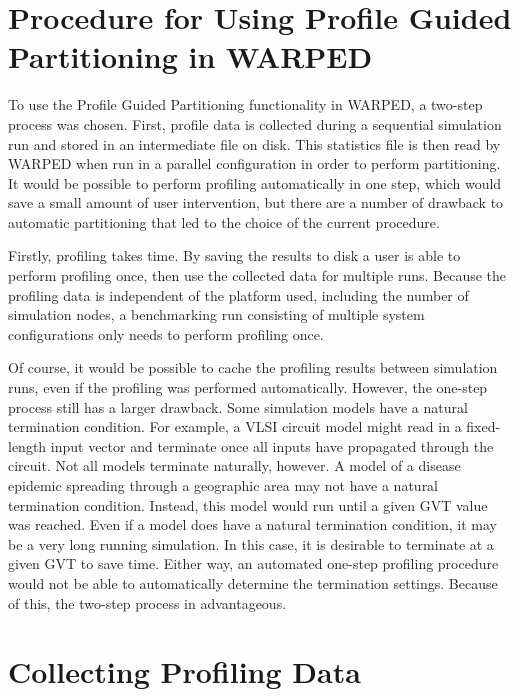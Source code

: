 \documentclass[11pt]{book}
\begin{document}
\section{Procedure for Using Profile Guided Partitioning in WARPED}

To use the Profile Guided Partitioning functionality in WARPED, a two-step process was chosen. First, profile data is collected during a sequential simulation run and stored in an intermediate file on disk. This statistics file is then read by WARPED when run in a parallel configuration in order to perform partitioning. It would be possible to perform profiling automatically in one step, which would save a small amount of user intervention, but there are a number of drawback to automatic partitioning that led to the choice of the current procedure.

Firstly, profiling takes time. By saving the results to disk a user is able to perform profiling once, then use the collected data for multiple runs. Because the profiling data is independent of the platform used, including the number of simulation nodes, a benchmarking run consisting of multiple system configurations only needs to perform profiling once. 

Of course, it would be possible to cache the profiling results between simulation runs, even if the profiling was performed automatically. However, the one-step process still has a larger drawback. Some simulation models have a natural termination condition. For example, a VLSI circuit model might read in a fixed-length input vector and terminate once all inputs have propagated through the circuit. Not all models terminate naturally, however. A model of a disease epidemic spreading through a geographic area may not have a natural termination condition. Instead, this model would run until a given GVT value was reached. Even if a model does have a natural termination condition, it may be a very long running simulation. In this case, it is desirable to terminate at a given GVT to save time. Either way, an automated one-step profiling procedure would not be able to automatically determine the termination settings. Because of this, the two-step process in advantageous.

\section{Collecting Profiling Data}\label{sec:collectingProfilingData}
\end{document}
